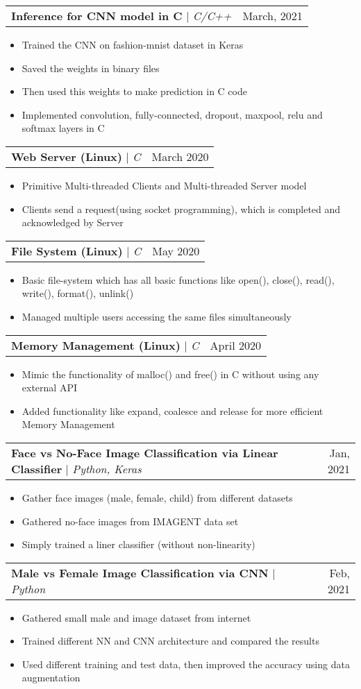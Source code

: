 \documentclass[letterpaper,11pt]{article}
\makeatletter
\newcommand{\resumeItem}[1]{
  \item\small{
    {#1 \vspace{-2pt}}
  }
}
\newcommand{\resumeProjectHeading}[2]{
    \item
    \begin{tabular*}{0.97\textwidth}{l@{\extracolsep{\fill}}r}
      \small#1 & #2 \\
    \end{tabular*}\vspace{-7pt}
}
\newcommand{\resumeItemListStart}{\begin{itemize}}
\newcommand{\resumeItemListEnd}{\end{itemize}\vspace{-5pt}}
\makeatother
\begin{document}
      \resumeProjectHeading
          {\textbf{Inference for CNN model in C} $|$ \emph{C/C++}}{March, 2021}
          \resumeItemListStart
            \resumeItem{Trained the CNN on fashion-mnist dataset in Keras}
            \resumeItem{Saved the weights in binary files}
            \resumeItem{Then used this weights to make prediction in C code}
            \resumeItem{Implemented convolution, fully-connected, dropout, maxpool, relu and softmax layers in C}
          \resumeItemListEnd
          
      \resumeProjectHeading
          {\textbf{Web Server (Linux)} $|$ \emph{C}}{March 2020}
          \resumeItemListStart
            \resumeItem{Primitive Multi-threaded Clients and Multi-threaded Server model }
            \resumeItem{Clients send a request(using socket programming), which is completed and acknowledged by Server}
          \resumeItemListEnd              
          
   
      \resumeProjectHeading
          {\textbf{File System (Linux)} $|$ \emph{C}}{May 2020}
          \resumeItemListStart
            \resumeItem{Basic file-system which has all basic functions like open(), close(), read(), write(), format(), unlink()}
            \resumeItem {Managed multiple users accessing the same files simultaneously }
          \resumeItemListEnd
          
      \resumeProjectHeading
          {\textbf{Memory Management (Linux)} $|$ \emph{C}}{April 2020}
          \resumeItemListStart
            \resumeItem{Mimic the functionality of malloc() and free() in C without using any external API }
            \resumeItem {Added functionality like expand, coalesce and release for more efficient Memory Management}
          \resumeItemListEnd  
   
          
      \resumeProjectHeading
          {\textbf{Face vs No-Face Image Classification via Linear Classifier} $|$ \emph{Python, Keras}}{Jan, 2021}
          \resumeItemListStart
            \resumeItem{Gather face images (male, female, child) from different datasets}
            \resumeItem{Gathered no-face images from IMAGENT data set}
            \resumeItem{Simply trained a liner classifier (without non-linearity)}
          \resumeItemListEnd

      \resumeProjectHeading
          {\textbf{Male vs Female Image Classification via CNN} $|$ \emph{Python}}{Feb, 2021}
          \resumeItemListStart
            \resumeItem{Gathered small male and image dataset from internet}
            \resumeItem{Trained different NN and CNN architecture and compared the results}
            \resumeItem{Used different training and test data, then improved the accuracy using data augmentation}
          \resumeItemListEnd
    
\end{document}
